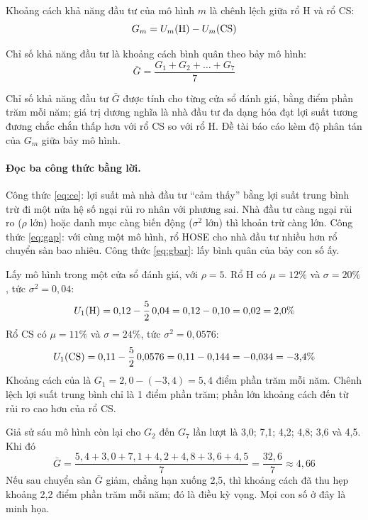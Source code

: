 Khoảng cách khả năng đầu tư của mô hình $m$ là chênh lệch giữa rổ H và rổ CS:
\begin{equation}\label{eq:gap}
G_m = U_m(\mathrm{H}) - U_m(\mathrm{CS})
\end{equation}

Chỉ số khả năng đầu tư là khoảng cách bình quân theo bảy mô hình:
\begin{equation}\label{eq:gbar}
\bar{G} = \frac{G_1 + G_2 + \dots + G_7}{7}
\end{equation}

Chỉ số khả năng đầu tư $\bar{G}$ được tính cho từng cửa sổ đánh giá, bằng điểm phần trăm mỗi năm; giá trị dương nghĩa là nhà đầu tư đa dạng hóa đạt lợi suất tương đương chắc chắn thấp hơn với rổ CS so với rổ H. Đề tài báo cáo kèm độ phân tán của $G_m$ giữa bảy mô hình.

\paragraph{Đọc ba công thức bằng lời.} Công thức \eqref{eq:ce}: lợi suất mà nhà đầu tư \enquote{cảm thấy} bằng lợi suất trung bình trừ đi một nửa hệ số ngại rủi ro nhân với phương sai. Nhà đầu tư càng ngại rủi ro ($\rho$ lớn) hoặc danh mục càng biến động ($\sigma^2$ lớn) thì khoản trừ càng lớn. Công thức \eqref{eq:gap}: với cùng một mô hình, rổ HOSE cho nhà đầu tư nhiều hơn rổ chuyển sàn bao nhiêu. Công thức \eqref{eq:gbar}: lấy bình quân của bảy con số ấy.

\begin{vidu}
Lấy mô hình  trong một cửa sổ đánh giá, với $\rho = 5$. Rổ H có $\mu = 12\%$ và $\sigma = 20\%$, tức $\sigma^2 = 0{,}04$:
\[
U_1(\mathrm{H}) = 0{,}12 - \frac{5}{2}\,0{,}04 = 0{,}12 - 0{,}10 = 0{,}02 = 2{,}0\%
\]
Rổ CS có $\mu = 11\%$ và $\sigma = 24\%$, tức $\sigma^2 = 0{,}0576$:
\[
U_1(\mathrm{CS}) = 0{,}11 - \frac{5}{2}\,0{,}0576 = 0{,}11 - 0{,}144 = -0{,}034 = -3{,}4\%
\]
Khoảng cách của  là $G_1 = 2{,}0 - (-3{,}4) = 5{,}4$ điểm phần trăm mỗi năm. Chênh lệch lợi suất trung bình chỉ là 1 điểm phần trăm; phần lớn khoảng cách đến từ rủi ro cao hơn của rổ CS.

Giả sử sáu mô hình còn lại cho $G_2$ đến $G_7$ lần lượt là 3,0; 7,1; 4,2; 4,8; 3,6 và 4,5. Khi đó
\[
\bar{G} = \frac{5{,}4 + 3{,}0 + 7{,}1 + 4{,}2 + 4{,}8 + 3{,}6 + 4{,}5}{7} = \frac{32{,}6}{7} \approx 4{,}66
\]
Nếu sau chuyển sàn $\bar{G}$ giảm, chẳng hạn xuống 2,5, thì khoảng cách đã thu hẹp khoảng 2,2 điểm phần trăm mỗi năm; đó là điều  kỳ vọng. Mọi con số ở đây là minh họa.
\end{vidu}

